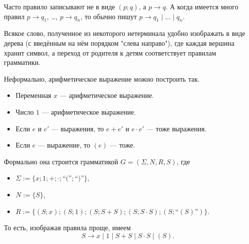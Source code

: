 \documentclass[12pt,a4paper]{article}
\begin{document}
    \begin{remark*}
        Часто правило записывают не в виде $(p; q)$, а $p \to q$. А когда имеется много правил $p \to q_1$, \dots, $p \to q_n$, то обычно пишут $p \to q_1 \mid \dots \mid q_n$.
    \end{remark*}

    \begin{remark*}
        Всякое слово, полученное из некоторого нетерминала удобно изображать в виде дерева (с введённым на нём порядком "слева направо"), где каждая вершина хранит символ, а переход от родителя к детям соответствует правилам грамматики.
    \end{remark*}

    \begin{example}
        Неформально, арифметическое выражение можно построить так.
        \begin{itemize}
            \item Переменная $x$ --- арифметическое выражение.
            \item Число $1$ --- арифметическое выражение.
            \item Если $e$ и $e'$ --- выражения, то $e + e'$ и $e \cdot e'$ --- тоже выражения.
            \item Если $e$ --- выражение, то $(e)$ --- тоже.
        \end{itemize}

        Формально она строится грамматикой $G = (\Sigma, N, R, S)$, где
        \begin{itemize}
            \item $\Sigma := \{x; 1; {+}; {\cdot}; \text{``(''}; \text{``)''}\}$,
            \item $N := \{S\}$,
            \item $R := \{(S; x); (S; 1); (S; S+S); (S; S \cdot S); (S; \text{``}(S)\text{''})\}$.
        \end{itemize}
        То есть, изображая правила проще, имеем
        \[S \to x \mid 1 \mid S + S \mid S \cdot S \mid (S).\]
    \end{example}
\end{document}
